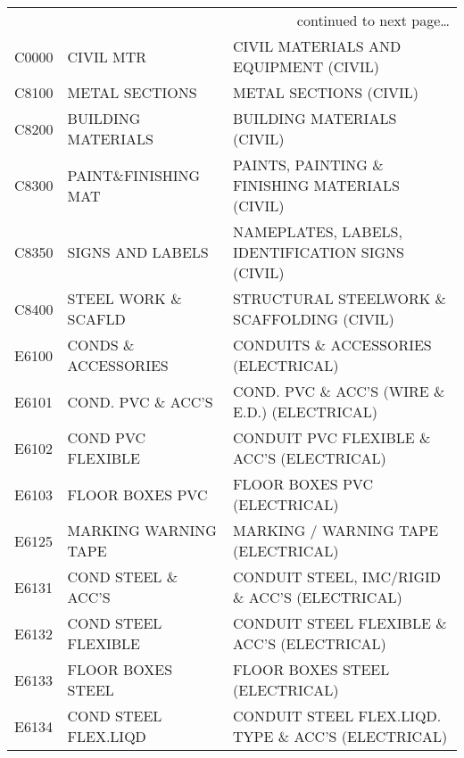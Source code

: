 \begin{longtable}[l]{l%
                  l|%
                  l|}
\endhead
\multicolumn{3}{r}{continued to next page\ldots}\\
\endfoot
\endlastfoot
\rowcolor{thetableheadbgcolor!0.25!white} C0000       & CIVIL MTR   & CIVIL MATERIALS AND EQUIPMENT (CIVIL)   \\
\rowcolor{thetableheadbgcolor!0.25!white} C8100       & METAL SECTIONS   & METAL SECTIONS (CIVIL)   \\
\rowcolor{thetableheadbgcolor!0.25!white} C8200       & BUILDING MATERIALS   & BUILDING MATERIALS (CIVIL)   \\
\rowcolor{thetableheadbgcolor!0.25!white} C8300       & PAINT\&FINISHING MAT   & PAINTS, PAINTING \& FINISHING MATERIALS (CIVIL)   \\
\rowcolor{thetableheadbgcolor!0.25!white} C8350       & SIGNS AND LABELS   & NAMEPLATES, LABELS, IDENTIFICATION SIGNS (CIVIL)   \\
\rowcolor{thetableheadbgcolor!0.25!white} C8400       & STEEL WORK \& SCAFLD   & STRUCTURAL STEELWORK \& SCAFFOLDING (CIVIL)   \\
\rowcolor{thetableheadbgcolor!0.25!white} E6100       & CONDS \& ACCESSORIES   & CONDUITS \& ACCESSORIES (ELECTRICAL)   \\
\rowcolor{thetableheadbgcolor!0.25!white} E6101       & COND. PVC \& ACC'S   & COND. PVC \& ACC'S (WIRE \& E.D.) (ELECTRICAL)   \\
\rowcolor{thetableheadbgcolor!0.25!white} E6102       & COND PVC FLEXIBLE   & CONDUIT PVC FLEXIBLE \& ACC'S (ELECTRICAL)   \\
\rowcolor{thetableheadbgcolor!0.25!white} E6103       & FLOOR BOXES PVC   & FLOOR BOXES PVC (ELECTRICAL)   \\
\rowcolor{thetableheadbgcolor!0.25!white} E6125       & MARKING WARNING TAPE   & MARKING / WARNING TAPE (ELECTRICAL)   \\
\rowcolor{thetableheadbgcolor!0.25!white} E6131       & COND STEEL \& ACC'S   & CONDUIT STEEL, IMC/RIGID \& ACC'S (ELECTRICAL)   \\
\rowcolor{thetableheadbgcolor!0.25!white} E6132       & COND STEEL FLEXIBLE   & CONDUIT STEEL FLEXIBLE \& ACC'S (ELECTRICAL)   \\
\rowcolor{thetableheadbgcolor!0.25!white} E6133       & FLOOR BOXES STEEL   & FLOOR BOXES STEEL (ELECTRICAL)   \\
\rowcolor{thetableheadbgcolor!0.25!white} E6134       & COND STEEL FLEX.LIQD   & CONDUIT STEEL FLEX.LIQD. TYPE \& ACC'S (ELECTRICAL)   \\

\end{longtable}
